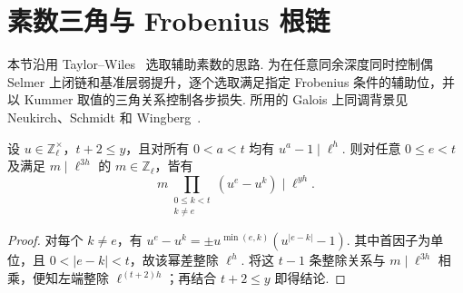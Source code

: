\section{素数三角与 Frobenius 根链}
\label{sec:c-prime-triangle}

本节沿用 Taylor--Wiles~\cite{TaylorWiles1995} 选取辅助素数的思路. 为在任意同余深度同时控制偶 Selmer 上闭链和基准层弱提升，逐个选取满足指定 Frobenius 条件的辅助位，并以 Kummer 取值的三角关系控制各步损失. 所用的 Galois 上同调背景见 Neukirch、Schmidt 和 Wingberg~\cite{NSW2008}.

\begin{lemma}[分圆幂差的整除预算]
\label{lem:c-triangle-power-differences}
\emitthmsource
设 $u\in\mathbb Z_\ell^\times$，$t+2\le y$，且对所有 $0<a<t$ 均有 $u^a-1\mid\ell^h$. 则对任意 $0\le e<t$ 及满足 $m\mid\ell^{3h}$ 的 $m\in\mathbb Z_\ell$，皆有
\[
 m\prod_{\substack{0\le k<t\\k\ne e}}(u^e-u^k)\mid\ell^{yh}.
\]
\end{lemma}
\begin{proof}
对每个 $k\ne e$，有 $u^e-u^k=\pm u^{\min(e,k)}(u^{|e-k|}-1)$. 其中首因子为单位，且 $0<|e-k|<t$，故该幂差整除 $\ell^h$. 将这 $t-1$ 条整除关系与 $m\mid\ell^{3h}$ 相乘，便知左端整除 $\ell^{(t+2)h}$；再结合 $t+2\le y$ 即得结论.
\end{proof}

